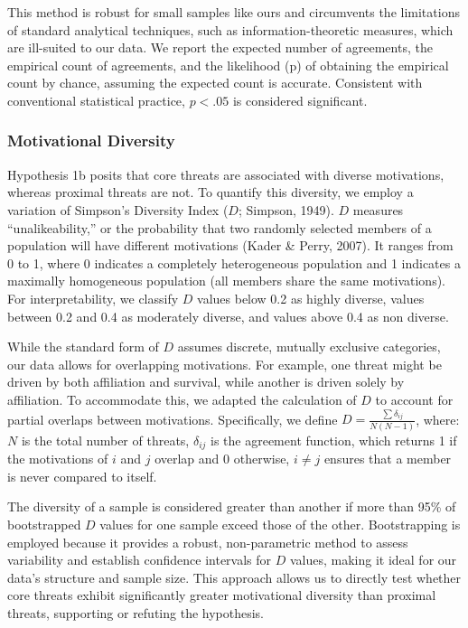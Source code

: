 \documentclass[
  man,floatsintext]{apa7}
\begin{document}
This method is robust for small samples like ours and circumvents the limitations of standard analytical techniques, such as information-theoretic measures, which are ill-suited to our data.
We report the expected number of agreements, the empirical count of agreements, and the likelihood (p) of obtaining the empirical count by chance, assuming the expected count is accurate.
Consistent with conventional statistical practice, \(p<.05\) is considered significant.

\subsubsection{Motivational Diversity}\label{motivational-diversity}

Hypothesis 1b posits that core threats are associated with diverse motivations, whereas proximal threats are not.
To quantify this diversity, we employ a variation of Simpson's Diversity Index (\(D\); Simpson, 1949).
\(D\) measures ``unalikeability,'' or the probability that two randomly selected members of a population will have different motivations (Kader \& Perry, 2007).
It ranges from 0 to 1, where 0 indicates a completely heterogeneous population and 1 indicates a maximally homogeneous population (all members share the same motivations).
For interpretability, we classify \(D\) values below 0.2 as highly diverse, values between 0.2 and 0.4 as moderately diverse, and values above 0.4 as non diverse.

While the standard form of \(D\) assumes discrete, mutually exclusive categories, our data allows for overlapping motivations.
For example, one threat might be driven by both affiliation and survival, while another is driven solely by affiliation.
To accommodate this, we adapted the calculation of \(D\) to account for partial overlaps between motivations.
Specifically, we define \(D = \frac{\sum \delta_{ij}}{N(N-1)}\), where: \(N\) is the total number of threats, \(\delta_{ij}\) is the agreement function, which returns 1 if the motivations of \(i\) and \(j\) overlap and 0 otherwise, \(i \neq j\) ensures that a member is never compared to itself.

The diversity of a sample is considered greater than another if more than 95\% of bootstrapped \(D\) values for one sample exceed those of the other.
Bootstrapping is employed because it provides a robust, non-parametric method to assess variability and establish confidence intervals for \(D\) values, making it ideal for our data's structure and sample size.
This approach allows us to directly test whether core threats exhibit significantly greater motivational diversity than proximal threats, supporting or refuting the hypothesis.
\end{document}
